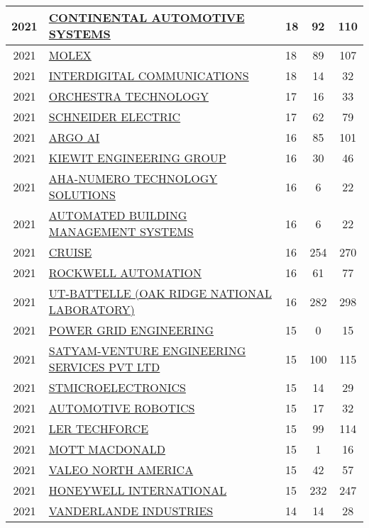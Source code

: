 \documentclass{article}%
\begin{document}
\begin{longtable}{c|p{20em}|p{5em}|c|c}
\hline%
2021&\hyperref[subsec:CONTINENTALAUTOMOTIVESYSTEMS]{CONTINENTAL AUTOMOTIVE SYSTEMS}&18&92&110\\%
\hline%
2021&\hyperref[subsec:MOLEX]{MOLEX}&18&89&107\\%
\hline%
2021&\hyperref[subsec:INTERDIGITALCOMMUNICATIONS]{INTERDIGITAL COMMUNICATIONS}&18&14&32\\%
\hline%
2021&\hyperref[subsec:ORCHESTRATECHNOLOGY]{ORCHESTRA TECHNOLOGY}&17&16&33\\%
\hline%
2021&\hyperref[subsec:SCHNEIDERELECTRIC]{SCHNEIDER ELECTRIC}&17&62&79\\%
\hline%
2021&\hyperref[subsec:ARGOAI]{ARGO AI}&16&85&101\\%
\hline%
2021&\hyperref[subsec:KIEWITENGINEERINGGROUP]{KIEWIT ENGINEERING GROUP}&16&30&46\\%
\hline%
2021&\hyperref[subsec:AHA{-}NUMEROTECHNOLOGYSOLUTIONS]{AHA{-}NUMERO TECHNOLOGY SOLUTIONS}&16&6&22\\%
\hline%
2021&\hyperref[subsec:AUTOMATEDBUILDINGMANAGEMENTSYSTEMS]{AUTOMATED BUILDING MANAGEMENT SYSTEMS}&16&6&22\\%
\hline%
2021&\hyperref[subsec:CRUISE]{CRUISE}&16&254&270\\%
\hline%
2021&\hyperref[subsec:ROCKWELLAUTOMATION]{ROCKWELL AUTOMATION}&16&61&77\\%
\hline%
2021&\hyperref[subsec:UT{-}BATTELLE(OAKRIDGENATIONALLABORATORY)]{UT{-}BATTELLE  (OAK RIDGE NATIONAL LABORATORY)}&16&282&298\\%
\hline%
2021&\hyperref[subsec:POWERGRIDENGINEERING]{POWER GRID ENGINEERING}&15&0&15\\%
\hline%
2021&\hyperref[subsec:SATYAM{-}VENTUREENGINEERINGSERVICESPVTLTD]{SATYAM{-}VENTURE ENGINEERING SERVICES PVT LTD}&15&100&115\\%
\hline%
2021&\hyperref[subsec:STMICROELECTRONICS]{STMICROELECTRONICS}&15&14&29\\%
\hline%
2021&\hyperref[subsec:AUTOMOTIVEROBOTICS]{AUTOMOTIVE ROBOTICS}&15&17&32\\%
\hline%
2021&\hyperref[subsec:LERTECHFORCE]{LER TECHFORCE}&15&99&114\\%
\hline%
2021&\hyperref[subsec:MOTTMACDONALD]{MOTT MACDONALD}&15&1&16\\%
\hline%
2021&\hyperref[subsec:VALEONORTHAMERICA]{VALEO NORTH AMERICA}&15&42&57\\%
\hline%
2021&\hyperref[subsec:HONEYWELLINTERNATIONAL]{HONEYWELL INTERNATIONAL}&15&232&247\\%
\hline%
2021&\hyperref[subsec:VANDERLANDEINDUSTRIES]{VANDERLANDE INDUSTRIES}&14&14&28\\%

\end{longtable}
\end{document}
